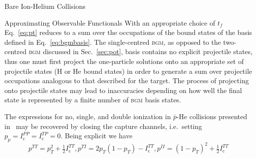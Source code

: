 \documentclass[letterpaper, 11 pt]{report}
\begin{document}
\begin{chapter}{Bare Ion-Helium Collisions \label{chap:p-he2p-he}}
\begin{section}{Approximating Observable Functionals \label{sec:phe2p-obs}}
      With an appropriate choice of $t_f$ Eq.~\eqref{eq:pt} reduces to a sum over the occupations of the
      bound states of the basis defined in Eq.~\eqref{eq:bgmbasis}. The single-centred \textsc{bgm}, as
      opposed to the two-centred \textsc{bgm} discussed in Sec.~\ref{sec:pot}, basis contains no
      explicit projectile states, thus one must first project the one-particle solutions onto an
      appropriate set of projectile states (H or He bound states) in order to generate a sum over
      projectile occupations analogous to that described for the target. The process of projecting onto
      projectile states may lead to inaccuracies depending on how well the final state is represented by
      a finite number of \textsc{bgm} basis states.

      The expressions for no, single, and double ionization in $\bar{p}$-He collisions presented
      in~\cite{pbarhe} may be recovered by closing the capture channels, i.e.\ setting
      $p_p = I^{PP}_\mathrm{c} = I^{TP}_\mathrm{c} = 0$. Being explicit we have
      \begin{subequations} \label{eq:prob-pbarhe}
         \begin{equation} \label{eq:ptt-pbarhe}
            p^{TT} = p_T^2 + \tfrac{1}{2} I^{TT}_\mathrm{c},
         \end{equation}
         \begin{equation} \label{eq:pti-pbarhe}
            p^{TI} = 2p_T(1 - p_T) - I^{TT}_\mathrm{c},
         \end{equation}
         \begin{equation} \label{eq:pii-pbarhe}
            p^{II} = (1 - p_T)^2 + \tfrac{1}{2} I^{TT}_\mathrm{c}
         \end{equation}
      \end{subequations}


\end{section}
\end{chapter}
\end{document}
